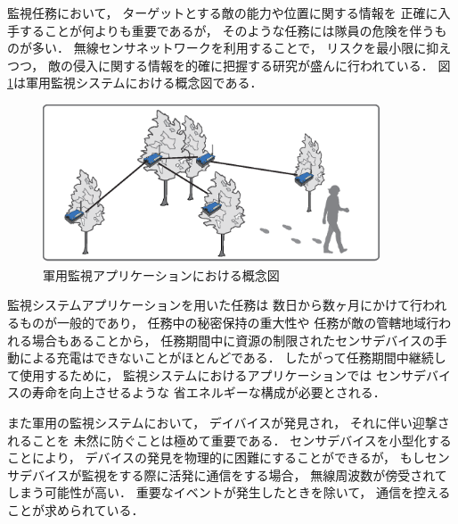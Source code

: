 \vspace{0.5em}監視任務において，
ターゲットとする敵の能力や位置に関する情報を
正確に入手することが何よりも重要であるが，
そのような任務には隊員の危険を伴うものが多い．
無線センサネットワークを利用することで，
リスクを最小限に抑えつつ，
敵の侵入に関する情報を的確に把握する研究が盛んに行われている．
図\ref{fig:surveillance_system}は軍用監視システムにおける概念図である．

\begin{figure}[htbp]
 \begin{center}
  \includegraphics[width=100mm]{./images/surveillance_system.eps}
 \end{center}
 \caption{軍用監視アプリケーションにおける概念図}
 \label{fig:surveillance_system}
\end{figure}



監視システムアプリケーションを用いた任務は
数日から数ヶ月にかけて行われるものが一般的であり，
任務中の秘密保持の重大性や
任務が敵の管轄地域行われる場合もあることから，
任務期間中に資源の制限されたセンサデバイスの手動による充電はできないことがほとんどである．
したがって任務期間中継続して使用するために，
監視システムにおけるアプリケーションでは
センサデバイスの寿命を向上させるような
省エネルギーな構成が必要とされる．

また軍用の監視システムにおいて，
デイバイスが発見され，
それに伴い迎撃されることを
未然に防ぐことは極めて重要である．
センサデバイスを小型化することにより，
デバイスの発見を物理的に困難にすることができるが，
もしセンサデバイスが監視をする際に活発に通信をする場合，
無線周波数が傍受されてしまう可能性が高い．
重要なイベントが発生したときを除いて，
通信を控えることが求められている．

